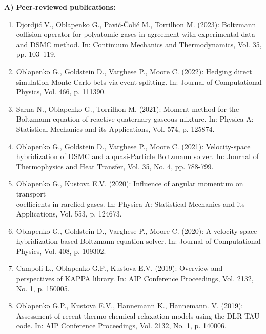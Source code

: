 \documentclass{resume} %
\begin{document}
{\bf A) Peer-reviewed publications:}
\begin{enumerate}

\item Djordji\'c V., Oblapenko G., Pavi\'c-\v Coli\'{c} M., Torrilhon M. (2023): Boltzmann collision operator for polyatomic gases in agreement with experimental data and DSMC method. In: Continuum Mechanics and Thermodynamics, Vol. 35, pp. 103–119.

\item {Oblapenko G.}, Goldstein D., Varghese P., Moore C. (2022): Hedging direct simulation Monte Carlo bets via event splitting. In: Journal of Computational Physics, Vol. 466, p. 111390.

\item Sarna N., Oblapenko G., Torrilhon M. (2021): Moment method for the Boltzmann equation of reactive quaternary gaseous mixture. In: Physica A: Statistical Mechanics and its Applications, Vol. 574, p. 125874.

\item {Oblapenko G.}, Goldstein D., Varghese P., Moore C. (2021): Velocity-space hybridization of DSMC and a quasi-Particle Boltzmann solver. In: Journal of Thermophysics and Heat Transfer, Vol. 35, No. 4, pp. 788-799.

\item {Oblapenko G.}, Kustova E.V. (2020): Influence of angular momentum on transport\\ coefficients in rarefied gases. In: Physica A: Statistical Mechanics and its Applications, Vol. 553, p. 124673.

\item {Oblapenko G.}, Goldstein D., Varghese P., Moore C. (2020): A velocity space hybridization-based Boltzmann equation solver. In: Journal of Computational Physics, Vol. 408, p. 109302.

\item {Campoli L., {Oblapenko G.P.}, Kustova E.V.} (2019): Overview and perspectives of KAPPA library. In: AIP Conference Proceedings, Vol. 2132, No. 1, p. 150005.

\item {{Oblapenko G.P.}, Kustova E.V., Hannemann K., Hannemann. V.} (2019): Assessment of recent thermo-chemical relaxation models using the DLR-TAU code. In: AIP Conference Proceedings, Vol. 2132, No. 1, p. 140006.


\end{enumerate}
\end{document}
